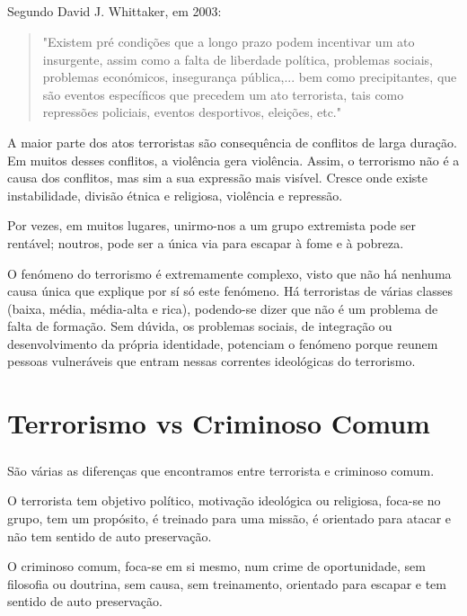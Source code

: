 \documentclass{report}
\begin{document}
\paragraph{} Segundo David J. Whittaker, em 2003: 
\begin {quotation}
"Existem pré condições que a longo prazo podem incentivar um ato insurgente, assim como a falta de liberdade política, problemas sociais, problemas económicos, insegurança pública,... bem como precipitantes, que são eventos específicos que precedem um ato terrorista, tais como repressões policiais, eventos desportivos, eleições, etc."
\end {quotation}
\par
A maior parte dos atos terroristas são consequência de conflitos de larga duração. Em muitos desses conflitos, a violência gera violência. Assim, o terrorismo não é a causa dos conflitos, mas sim a sua expressão mais visível. Cresce onde existe instabilidade, divisão étnica e religiosa, violência e repressão.\par
Por vezes, em muitos lugares, unirmo-nos a um grupo extremista pode ser rentável; noutros, pode ser a única via para escapar à fome e à pobreza. \par
O fenómeno do terrorismo é extremamente complexo, visto que não há nenhuma causa única que explique por sí só este fenómeno. Há terroristas de várias classes (baixa, média, média-alta e rica), podendo-se dizer que não é um problema de falta de formação. Sem dúvida, os problemas sociais, de integração ou desenvolvimento da própria identidade, potenciam o fenómeno porque reunem pessoas vulneráveis que entram nessas correntes ideológicas do terrorismo.



\chapter{Terrorismo vs Criminoso Comum}
\label{chap.Terrorismo vs Criminoso Comum}

\paragraph{} São várias as diferenças que encontramos entre terrorista e criminoso comum.\par
O terrorista tem objetivo político, motivação ideológica ou religiosa, foca-se no grupo, tem um propósito, é treinado para uma missão, é orientado para atacar e não tem sentido de auto preservação.\par
O criminoso comum, foca-se em si mesmo, num crime de oportunidade, sem filosofia ou doutrina, sem causa, sem treinamento, orientado para escapar e tem sentido de auto preservação.
\end{document}
